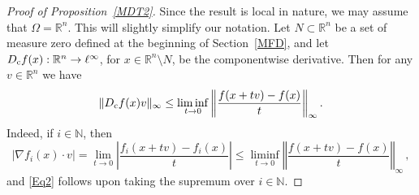\documentclass[12pt,leqno]{amsart}
\theoremstyle{definition}
\newcommand{\bbbn}{\mathbb N}
\newcommand{\bbbr}{\mathbb R}
\numberwithin{theorem}{section} \numberwithin{equation}{section}
\begin{document}
\begin{proof}[Proof of Proposition~\ref{MDT2}]
Since the result is local  in nature, we may assume that $\Omega=\bbbr^n$. This will slightly simplify our notation.
Let $N\subset\bbbr^n$ be a set of measure zero defined at the beginning of Section~\ref{MFD}, and let $D_{\rm c}f(x):\bbbr^n\to\ell^\infty$, for $x\in\bbbr^n\setminus N$, be the componentwise derivative. Then for
any $v\in\bbbr^n$ we have
\begin{equation}
\label{Eq2}
\Vert D_{\rm c}f(x)v\Vert_\infty\leq\liminf_{t\to 0}\left\Vert\frac{f(x+tv)-f(x)}{t}\right\Vert_\infty.
\end{equation}
Indeed, if $i\in\bbbn$, then
$$
|\nabla f_i(x)\cdot v|= \lim_{t\to 0}\left|\frac{f_i(x+tv)-f_i(x)}{t}\right|\leq\liminf_{t\to 0}\left\Vert \frac{f(x+tv)-f(x)}{t}\right\Vert_\infty\, ,
$$
and \eqref{Eq2} follows upon taking the supremum over $i\in\bbbn$.


\end{proof}
\end{document}

